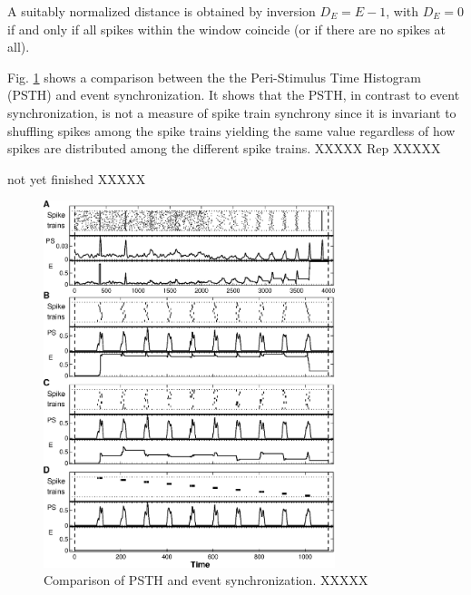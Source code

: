 \documentclass[10pt,twocolumn]{elsart5p}
\begin{document}
\begin{appendix}
A suitably normalized distance is obtained by inversion $D_E=E-1$, with $D_E = 0$ if and only if all spikes within the window coincide (or if there are no spikes at all).

Fig. \ref{fig:App-Fig1-PSTH-ES} shows a comparison between the the Peri-Stimulus Time Histogram (PSTH) and event synchronization. It shows that the PSTH, in contrast to event synchronization, is not a measure of spike train synchrony \citep{Kreuz11} since it is invariant to shuffling spikes among the spike trains yielding the same value regardless of how spikes are distributed among the different spike trains. XXXXX Rep XXXXX

not yet finished XXXXX

%
%
\begin{figure}
    \includegraphics[width=85mm]{App_Fig1_PSTH_ES.eps}
    \caption{\abb\label{fig:App-Fig1-PSTH-ES} Comparison of PSTH and event synchronization. \citep{QuianQuiroga02b} XXXXX}
\end{figure}
%
%


\end{appendix}
\end{document}
